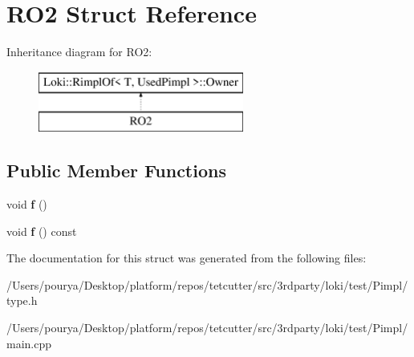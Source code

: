 \hypertarget{structRO2}{}\section{R\+O2 Struct Reference}
\label{structRO2}
Inheritance diagram for R\+O2\+:\begin{figure}[H]
\begin{center}
\leavevmode
\includegraphics[height=2.000000cm]{structRO2}
\end{center}
\end{figure}
\subsection*{Public Member Functions}
\begin{DoxyCompactItemize}
\item 
\hypertarget{structRO2_a1c381e6691ff2aeeaa703268b5400d7b}{}void {\bfseries f} ()\label{structRO2_a1c381e6691ff2aeeaa703268b5400d7b}

\item 
\hypertarget{structRO2_ae92f5f95e77f46c664d5a1dc22dbe72f}{}void {\bfseries f} () const \label{structRO2_ae92f5f95e77f46c664d5a1dc22dbe72f}

\end{DoxyCompactItemize}


The documentation for this struct was generated from the following files\+:\begin{DoxyCompactItemize}
\item 
/\+Users/pourya/\+Desktop/platform/repos/tetcutter/src/3rdparty/loki/test/\+Pimpl/type.\+h\item 
/\+Users/pourya/\+Desktop/platform/repos/tetcutter/src/3rdparty/loki/test/\+Pimpl/main.\+cpp\end{DoxyCompactItemize}
